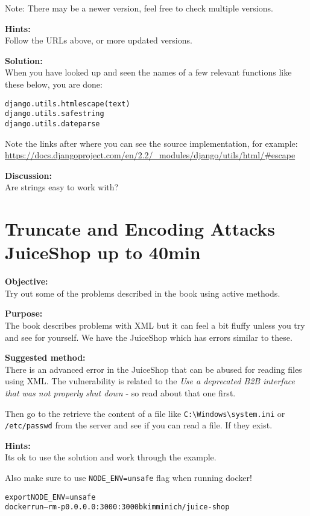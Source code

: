 \documentclass[a4paper,11pt,notitlepage]{report}
\begin{document}
Note: There may be a newer version, feel free to check multiple versions.

{\bf Hints:}\\
Follow the URLs above, or more updated versions.

{\bf Solution:}\\
When you have looked up and seen the names of a few relevant functions like these below, you are done:

\begin{alltt}
django.utils.html escape(text)
django.utils.safestring
django.utils.dateparse
\end{alltt}

Note the links after where you can see the source implementation, for example:\\
\url{https://docs.djangoproject.com/en/2.2/_modules/django/utils/html/#escape}


{\bf Discussion:}\\
Are strings easy to work with?


\chapter{Truncate and Encoding Attacks JuiceShop up to 40min}
\label{ex:truncate-encoding}

{\bf Objective:}\\
Try out some of the problems described in the book using active methods.

{\bf Purpose:}\\
The book describes problems with XML but it can feel a bit fluffy unless you try and see for yourself. We have the JuiceShop which has errors similar to these.

{\bf Suggested method:}\\
There is an advanced error in the JuiceShop that can be abused for reading files using XML.
The vulnerability is related to the \emph{Use a deprecated B2B interface that was not properly shut down} - so read about that one first.

Then go to the retrieve the content of a file like \verb+C:\Windows\system.ini+ or
\verb+/etc/passwd+ from the server and see if you can read a file. If they exist.


{\bf Hints:}\\
Its ok to use the solution and work through the example.

Also make sure to use \verb+NODE_ENV=unsafe+ flag when running docker!

\begin{alltt}
export NODE_ENV=unsafe
docker run --rm -p 0.0.0.0:3000:3000 bkimminich/juice-shop
\end{alltt}
\end{document}
